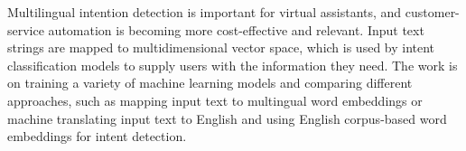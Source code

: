 
Multilingual intention detection is important for virtual assistants, and customer-service automation is becoming more cost-effective and relevant. Input text strings are mapped to multidimensional vector space, which is used by intent classification models to supply users with the information they need. The work is on training a variety of machine learning models and comparing different approaches, such as mapping input text to multingual word embeddings or machine translating input text to English and using English corpus-based word embeddings for intent detection.

